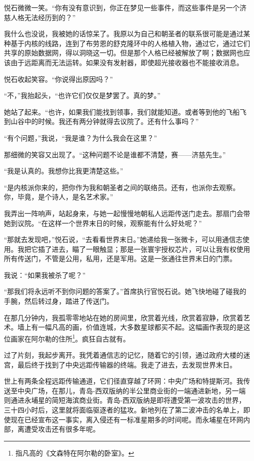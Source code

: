 \documentclass[AutoFakeBold=true]{book}
\begin{document}
悦石微微一笑。``你有没有意识到，你正在梦见一些事件，而这些事件是另一个济慈人格无法经历到的？''

我什么也没说，我被她的话惊呆了。我原以为自己和朝圣者的联系很可能是通过某种基于内核的线路，连到了布劳恩的舒克隆环中的人格植入物，通过它，通过它们共享的原始数据网，得以洞晓这一切。但是那个人格已经被解放了啊；数据网也应该由于远距离而无法运转。如果没有发射器，即使超光接收器也不能接收消息。

悦石收起笑容。``你说得出原因吗？''

``不，''我抬起头，``也许它们仅仅是梦罢了。真的梦。''

她站了起来。``也许，如果我们能找到领事，我们就能知道。或者等到他的飞船飞到山谷中的时候。我还有两分钟就得去议院了。还有什么事吗？''

``有个问题，''我说，``我是谁？为什么我会在这里？''

那细微的笑容又出现了。``这种问题不论是谁都不清楚，赛——济慈先生。''

``我是认真的。我想你比我更清楚这些。''

``是内核派你来的，把你作为我和朝圣者之间的联络员。还有，也派你去观察。你，毕竟，是个诗人，是名艺术家。''

我弄出一阵响声，站起身来，与她一起慢慢地朝私人远距传送门走去。那扇门会带她到议院。``在这样一个世界末日的时候，观察能有什么好处呢？''

``那就去发现吧，''悦石说，``去看看世界末日。''她递给我一张微卡，可以用通信志使用。我把它插了进去，瞄了一眼触显；那是一张寰宇授权芯片，可以让我有权使用所有传送门，不管是公用，私用，还是军用。这是一张通往世界末日的门票。

我说：``如果我被杀了呢？''

``那我们将永远听不到你问题的答案了。''首席执行官悦石说。她飞快地碰了碰我的手腕，然后转过身，踏进了传送门。

在那几分钟内，我孤零零地站在她的房间里，欣赏着光线，欣赏着寂静，欣赏着艺术。墙上有一幅凡高的画，价值连城，大多数星球都买不起。这幅画作表现的是这位画家在阿尔勒的住所\footnote{指凡高的《文森特在阿尔勒的卧室》。}。疯狂自古就有。

过了片刻，我起步离开。我凭着通信志的记忆，随着它的引领，通过政府大楼的迷宫，最后终于找到了中央远距传输器的终端。我走了进去，去发现世界末日。

\vspace*{1em}

世上有两条全程远距传输通道，它们径直穿越了环网：中央广场和特提斯河。我传送至中央广场，在那儿，青岛-西双版纳的半公里商业街的一端通进新地，另一端则通进永埔星的简短海滨商业街。青岛-西双版纳是即将遭受第一波攻击的世界，三十四小时后，这里就将面临驱逐者的猛攻。新地列在了第二波冲击的名单上，即使现在已经宣布这一事实，离入侵还有一标准星期多的时间呢。而永埔星在环网内部，离遭受攻击还有很多年呢。
\end{document}
